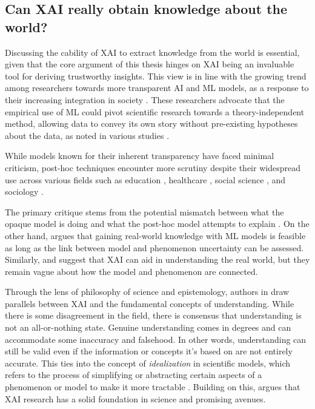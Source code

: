 \subsection{Can XAI really obtain knowledge about the world?}
\label{xai_can_fail_but_is_usable}

Discussing the cability of \gls{XAI} to extract knowledge from the world is essential, given that the core argument of this thesis hinges on \gls{XAI} being an invaluable tool for deriving trustworthy insights. This view is in line with the growing trend among researchers towards more transparent \gls{AI} and \gls{ML} models, as a response to their increasing integration in society \cite{Arya2019OneTechniques}. These researchers advocate that the empirical use of \gls{ML} could pivot scientific research towards a theory-independent method, allowing data to convey its own story without pre-existing hypotheses about the data, as noted in various studies \cite{Kitchin2014BigShifts, Anderson2008TheObsolete, Naimi2014BigThink, Andrews2023TheIdeal, Lieberson2008ImplicationSciences}.

While models known for their inherent transparency have faced minimal criticism, post-hoc techniques encounter more scrutiny  despite their widespread use across various fields such as education \cite{Lezhnina2022CombiningPISA, Martinez-Abad2020EducationalAssessment}, healthcare \cite{Jauhiainen2021NewAthletes, Stiglic2020InterpretabilityHealthcare}, social science \cite{Berger2023ExplainableChains, Bellantuono2023DetectingIntelligence}, and sociology \cite{Li2023ApplyingPandemic, Fan2023InterpretableInequality}.


The primary critique stems from the potential mismatch between what the opaque model is doing and what the post-hoc model attempts to explain \cite{Rudin2019StopInstead, Mullainathan2017MachineApproach, Babic2021BewareCare}. On the other hand, \cite{Sullivan2022UnderstandingModels} argues that gaining real-world knowledge with ML models is feasible as long as the link between model and phenomenon uncertainty can be assessed. Similarly, \cite{Cichy2019DeepModels} and \cite{Zednik2021SolvingIntelligence} suggest that \gls{XAI} can aid in understanding the real world, but they remain vague about how the model and phenomenon are connected.

Through the lens of philosophy of science and epistemology, authors in \cite{Fleisher2022UnderstandingAI} draw parallels between \gls{XAI} and the fundamental concepts of understanding. While there is some disagreement in the field, there is consensus that understanding is not an all-or-nothing state. Genuine understanding comes in degrees and can accommodate some inaccuracy and falsehood. In other words, understanding can still be valid even if the information or concepts it's based on are not entirely accurate. This ties into the concept of \textit{idealization} in scientific models, which refers to the process of simplifying or abstracting certain aspects of a phenomenon or model to make it more tractable \cite{Jebeile2015ExplainingIdealizations}. Building on this, \cite{Fleisher2022UnderstandingAI} argues that \gls{XAI} research has a solid foundation in science and promising avenues.

